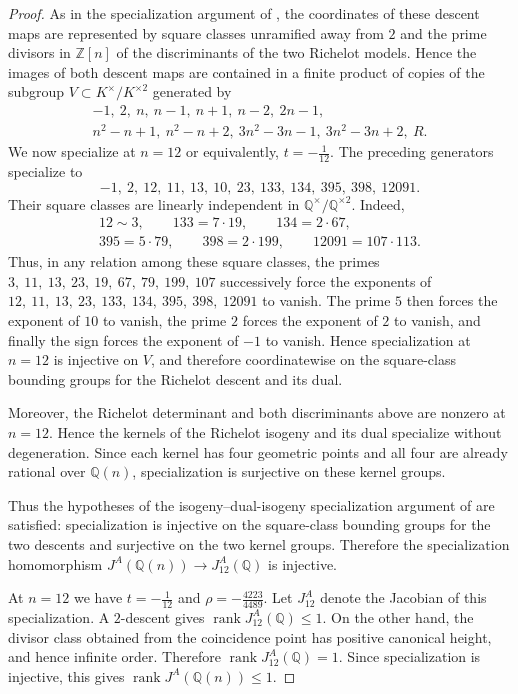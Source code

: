 \documentclass[11pt]{amsart}
\theoremstyle{plain}
\theoremstyle{remark}
\theoremstyle{plain}
\newcommand{\Q}{\mathbb{Q}}
\newcommand{\Z}{\mathbb{Z}}
\begin{document}
\begin{proof}
As in the specialization argument of
\cite[Section~5, Remarks~5.3--5.4]{Stoll2019}, the coordinates of
these descent maps are represented by square classes unramified away
from $2$ and the prime divisors in $\Z[n]$ of the discriminants of
the two Richelot models. Hence the images of both descent maps are
contained in a finite product of copies of the subgroup
$
V\subset K^\times/K^{\times2}$
generated by
\[
\begin{gathered}
-1,\ 2,\ n,\ n-1,\ n+1,\ n-2,\ 2n-1,\\
n^2-n+1,\ n^2-n+2,\ 3n^2-3n-1,\ 3n^2-3n+2,\ R.
\end{gathered}
\]
We now specialize at
$n=12$ or equivalently, $t=-\frac1{12}$.
The preceding generators specialize to
\[
-1,\ 2,\ 12,\ 11,\ 13,\ 10,\ 23,\ 133,\ 134,\ 395,\ 398,\ 12091.
\]
Their square classes are linearly independent in
$\Q^\times/\Q^{\times2}$. Indeed,
\[
\begin{gathered}
12\sim3,\qquad
133=7\cdot19,\qquad
134=2\cdot67,\\
395=5\cdot79,\qquad
398=2\cdot199,\qquad
12091=107\cdot113.
\end{gathered}
\]
Thus, in any relation among these square classes, the primes
$3,\ 11,\ 13,\ 23,\ 19,\ 67,\ 79,\ 199,\ 107$
successively force the exponents of
$12,\ 11,\ 13,\ 23,\ 133,\ 134,\ 395,\ 398,\ 12091$
to vanish. The prime $5$ then forces the exponent of $10$ to vanish,
the prime $2$ forces the exponent of $2$ to vanish, and finally the
sign forces the exponent of $-1$ to vanish. Hence specialization at
$n=12$ is injective on $V$, and therefore coordinatewise on the
square-class bounding groups for the Richelot descent and its dual.

Moreover, the Richelot determinant and both discriminants above are
nonzero at $n=12$. Hence the kernels of the Richelot isogeny and its
dual specialize without degeneration. Since each kernel has four
geometric points and all four are already rational over $\Q(n)$,
specialization is surjective on these kernel groups.

Thus the hypotheses of the isogeny--dual-isogeny specialization
argument of \cite[Corollary~5.2 and Remarks~5.3--5.4]{Stoll2019}
are satisfied: specialization is injective on the square-class
bounding groups for the two descents and surjective on the two kernel
groups. Therefore the specialization homomorphism
$J^A(\Q(n))\longrightarrow J^A_{12}(\Q)$
is injective.


At $n=12$ we have
$t=-\frac1{12}$ and $\rho=-\frac{4223}{4489}$.
Let $J^A_{12}$ denote the Jacobian of this specialization. A
$2$-descent gives
$\operatorname{rank}J^A_{12}(\Q)\leq1$.
On the other hand, the divisor class obtained from the coincidence
point has positive canonical height, and hence infinite order.
Therefore
$\operatorname{rank}J^A_{12}(\Q)=1$.
Since specialization is injective, this gives
$\operatorname{rank}J^A(\Q(n))\leq1$.




\end{proof}
\end{document}
